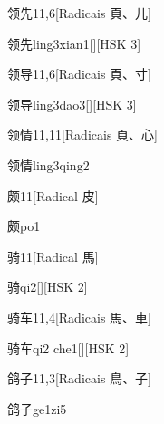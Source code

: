 \begin{entry}{领先}{11,6}[Radicais ⾴、⼉]
  \begin{phonetics}{领先}{ling3xian1}[][HSK 3]
  \end{phonetics}
\end{entry}

\begin{entry}{领导}{11,6}[Radicais ⾴、⼨]
  \begin{phonetics}{领导}{ling3dao3}[][HSK 3]
  \end{phonetics}
\end{entry}

\begin{entry}{领情}{11,11}[Radicais ⾴、⼼]
  \begin{phonetics}{领情}{ling3qing2}
  \end{phonetics}
\end{entry}

\begin{entry}{颇}{11}[Radical ⽪]
  \begin{phonetics}{颇}{po1}
  \end{phonetics}
\end{entry}

\begin{entry}{骑}{11}[Radical ⾺]
  \begin{phonetics}{骑}{qi2}[][HSK 2]
  \end{phonetics}
\end{entry}

\begin{entry}{骑车}{11,4}[Radicais ⾺、⾞]
  \begin{phonetics}{骑车}{qi2 che1}[][HSK 2]
  \end{phonetics}
\end{entry}

\begin{entry}{鸽子}{11,3}[Radicais ⿃、⼦]
  \begin{phonetics}{鸽子}{ge1zi5}
  \end{phonetics}
\end{entry}

